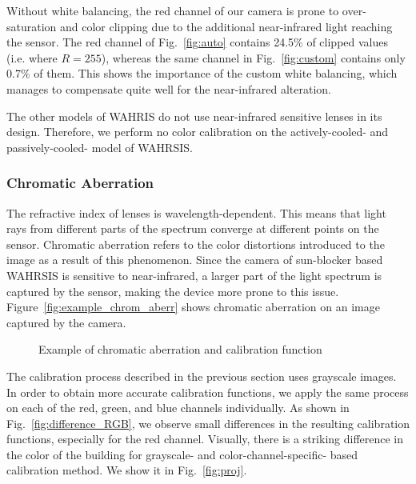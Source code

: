 Without white balancing, the red channel of our camera is prone to over-saturation and color clipping due to the additional near-infrared light reaching the sensor. The red channel of Fig.~\ref{fig:auto} contains 24.5\% of clipped values (i.e. where $R=255$), whereas the same channel in Fig.~\ref{fig:custom} contains only 0.7\% of them. This shows the importance of the custom white balancing, which manages to compensate quite well for the near-infrared alteration.

The other models of WAHRIS do not use near-infrared sensitive lenses in its design. Therefore, we perform no color calibration on the actively-cooled- and passively-cooled- model of WAHRSIS.

\subsubsection{Chromatic Aberration} 
\label{sec:chromatic_aberration}

The refractive index of lenses is wavelength-dependent. This means that light rays from different parts of the spectrum converge at different points on the sensor. Chromatic aberration refers to the color distortions introduced to the image as a result of this phenomenon. Since the camera of sun-blocker based WAHRSIS is sensitive to near-infrared, a larger part of the light spectrum is captured by the sensor, making the device more prone to this issue. Figure~\ref{fig:example_chrom_aberr} shows chromatic aberration on an image captured by the camera.


\begin{figure}[htb]
\centering
{}
\quad 
{}
\caption{Example of chromatic aberration and calibration function}
\end{figure}


The calibration process described in the previous section uses grayscale images. In order to obtain more accurate calibration functions, we apply the same process on each of the red, green, and blue channels individually. As shown in Fig.~\ref{fig:difference_RGB}, we observe small differences in the resulting calibration functions, especially for the red channel. Visually, there is a striking difference in the color of the building for grayscale- and color-channel-specific- based calibration method. We show it in Fig.~\ref{fig:proj}.

